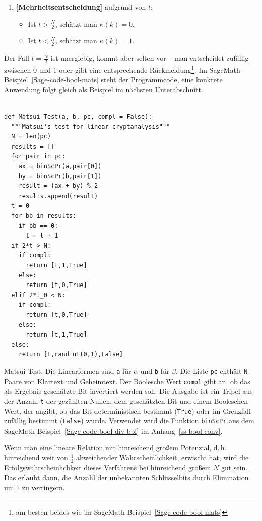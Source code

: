 \begin{refsegment}
\begin{enumerate}
	\item {\bf [Mehrheitsentscheidung]} aufgrund von $t$:
	  \begin{itemize}
	    \item Ist $t > \frac{N}{2}$, schätzt man $\kappa(k) = 0$.
	    \item Ist $t < \frac{N}{2}$, schätzt man $\kappa(k) = 1$.
	  \end{itemize}
\end{enumerate}
Der Fall $t = \frac{N}{2}$ ist unergiebig, kommt aber selten vor -- man
entscheidet zufällig zwischen $0$ und $1$ oder gibt eine entsprechende
Rückmeldung\footnote{%
   am besten beides wie im SageMath-Beispiel~\ref{Sage-code-bool-mats}
}. Im SageMath-Beispiel~\ref{Sage-code-bool-mats}
steht der Programmcode, eine konkrete Anwendung folgt gleich als Beispiel
im nächsten Unterabschnitt.

\begin{sagecode}
\begin{verbatim}

def Matsui_Test(a, b, pc, compl = False):
  """Matsui's test for linear cryptanalysis"""
  N = len(pc)
  results = []
  for pair in pc:
    ax = binScPr(a,pair[0])
    by = binScPr(b,pair[1])
    result = (ax + by) % 2
    results.append(result)
  t = 0
  for bb in results:
    if bb == 0:
      t = t + 1
  if 2*t > N:
    if compl:
      return [t,1,True]
    else:
      return [t,0,True]
  elif 2*t_0 < N:
    if compl:
      return [t,0,True]
    else:
      return [t,1,True]
  else:
    return [t,randint(0,1),False]
\end{verbatim}
\caption{Matsui-Test. Die Linearformen sind {\tt a} für $\alpha$ und
   {\tt b} für $\beta$. Die Liste {\tt pc} enthält {\tt N} Paare von Klartext
   und Geheimtext. Der Boolesche Wert {\tt compl} gibt an, ob das
   als Ergebnis geschätzte Bit invertiert werden soll. Die Ausgabe
   ist ein Tripel aus der Anzahl {\tt t} der gezählten Nullen,
   dem geschätzten Bit und einem Booleschen Wert, der angibt, ob das
   Bit deterministisch bestimmt ({\tt True}) oder im Grenzfall
   zufällig bestimmt ({\tt False}) wurde. Verwendet wird die Funktion
   {\tt binScPr} aus dem SageMath-Beispiel~\ref{Sage-code-bool-div-bbl}
   im Anhang~\ref{ss-bool-conv}.}\label{Sage-code-bool-mats}
\end{sagecode}

Wenn man eine lineare Relation
mit hinreichend großem Potenzial, d.\,h.
hinreichend weit von $\frac{1}{2}$ abweichender Wahrscheinlichkeit, erwischt hat,
wird die Erfolgswahrscheinlichkeit dieses Verfahrens bei hinreichend
großem $N$ gut sein. Das erlaubt dann, die Anzahl der unbekannten
Schlüsselbits durch Elimination um 1 zu verringern.


\end{refsegment}
